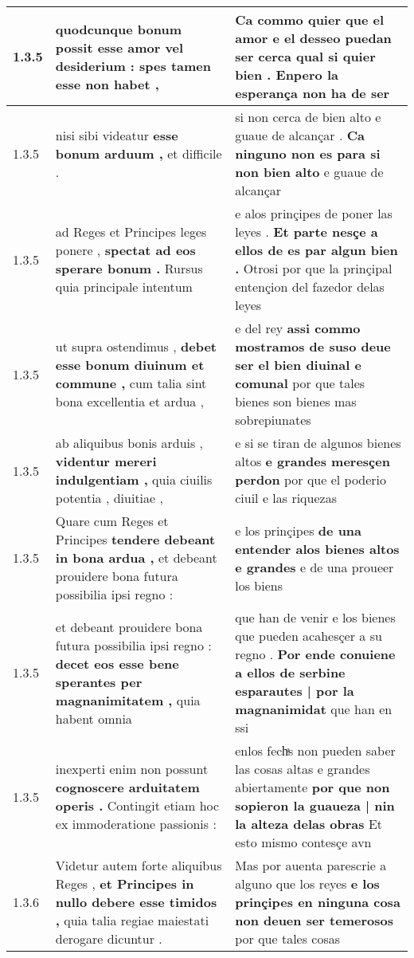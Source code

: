 \begin{tabular}{|p{1cm}|p{6.5cm}|p{6.5cm}|}
1.3.5 & quodcunque bonum possit \textbf{ esse amor vel desiderium : } spes tamen esse non habet , & Ca commo quier que el amor e el desseo puedan ser cerca \textbf{ qual si quier bien . } Enpero la esperança non ha de ser \\\hline
1.3.5 & nisi sibi videatur \textbf{ esse bonum arduum , } et difficile . & si non cerca de bien alto e guaue de alcançar . \textbf{ Ca ninguno non es para si non bien alto } e guaue de alcançar \\\hline
1.3.5 & ad Reges et Principes leges ponere , \textbf{ spectat ad eos sperare bonum . } Rursus quia principale intentum & e alos prinçipes de poner las leyes . \textbf{ Et parte nesçe a ellos de es par algun bien . } Otrosi por que la prinçipal entençion del fazedor delas leyes \\\hline
1.3.5 & ut supra ostendimus , \textbf{ debet esse bonum diuinum et commune , } cum talia sint bona excellentia et ardua , & e del rey \textbf{ assi commo mostramos de suso deue ser el bien diuinal e comunal } por que tales bienes son bienes mas sobrepiunates \\\hline
1.3.5 & ab aliquibus bonis arduis , \textbf{ videntur mereri indulgentiam , } quia ciuilis potentia , diuitiae , & e si se tiran de algunos bienes altos \textbf{ e grandes meresçen perdon } por que el poderio ciuil e las riquezas \\\hline
1.3.5 & Quare cum Reges et Principes \textbf{ tendere debeant in bona ardua , } et debeant prouidere bona futura possibilia ipsi regno : & e los prinçipes \textbf{ de una entender alos bienes altos e grandes } e de una proueer los biens \\\hline
1.3.5 & et debeant prouidere bona futura possibilia ipsi regno : \textbf{ decet eos esse bene sperantes per magnanimitatem , } quia habent omnia & que han de venir e los bienes que pueden acahesçer a su regno . \textbf{ Por ende conuiene a ellos de serbine esparautes | por la magnanimidat } que han en ssi \\\hline
1.3.5 & inexperti enim non possunt \textbf{ cognoscere arduitatem operis . } Contingit etiam hoc ex immoderatione passionis : & enlos fechͣs non pueden saber las cosas altas e grandes abiertamente \textbf{ por que non sopieron la guaueza | nin la alteza delas obras } Et esto mismo contesçe avn \\\hline
1.3.6 & Videtur autem forte aliquibus Reges , \textbf{ et Principes in nullo debere esse timidos , } quia talia regiae maiestati derogare dicuntur . & Mas por auenta parescrie a alguno que los reyes \textbf{ e los prinçipes en ninguna cosa non deuen ser temerosos } por que tales cosas \\\hline

\end{tabular}
